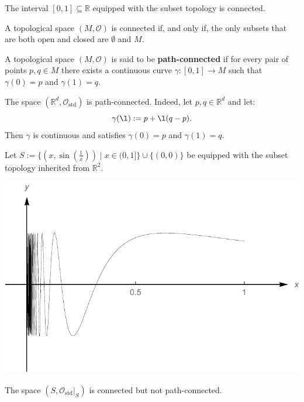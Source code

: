 \documentclass[root.tex]{subfiles}
\begin{document}
\begin{theorem}
The interval $[0,1]\subseteq\mathbb{R}$ equipped with the subset topology is connected.
\end{theorem}

\begin{theorem}
A topological space $(M,\mathcal{O})$ is connected if, and only if, the only subsets that are both open and closed are $\emptyset$ and $M$.
\end{theorem}

\begin{mydef}
  A topological space $(M,\mathcal{O})$ is said to be \textbf{path-connected} if for every pair of points $p,q\in M$ there exists a continuous curve $\gamma:[0,1]\to M$ such that $\gamma(0)=p$ and $\gamma(1)=q$.
\end{mydef}

\begin{myex}
The space $(\mathbb{R}^d,\mathcal{O}_\mathrm{std})$ is path-connected. Indeed, let $p,q\in\mathbb{R}^d$ and let:
$$
\gamma(\l):=p+\l(q-p).
$$
Then $\gamma$ is continuous and satisfies $\gamma(0)=p$ and $\gamma(1)=q$.
\end{myex}

\begin{myex}
Let $S:=\{(x,\sin(\tfrac{1}{x}))\mid x\in (0,1]\}\cup \{(0,0)\}$ be equipped with the subset topology inherited from $\mathbb{R}^2$.
\begin{center}
\includegraphics[scale=0.7]{img/sinoneoverx}
\end{center}
The space $(S,\mathcal{O}_\mathrm{std}|_S)$ is connected but not path-connected.
\end{myex}
\end{document}
